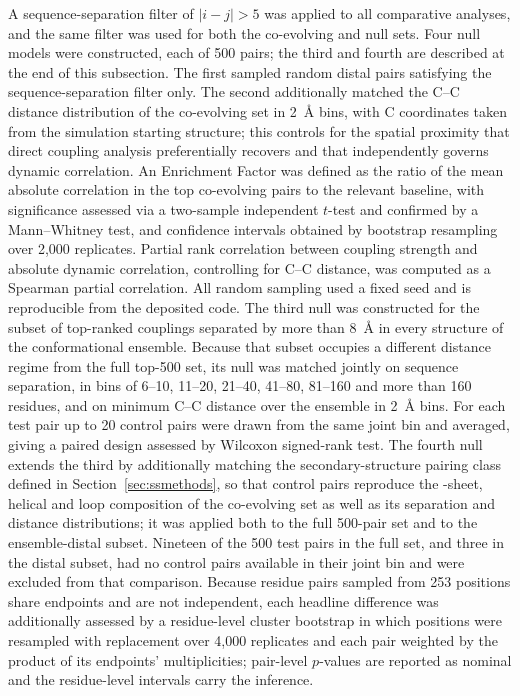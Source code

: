 \documentclass[utf8]{FrontiersinHarvard}
\begin{document}
A sequence-separation filter of $|i-j|>5$ was applied to all comparative analyses, and the same filter was used for both the co-evolving and null sets. Four null models were constructed, each of 500 pairs; the third and fourth are described at the end of this subsection. The first sampled random distal pairs satisfying the sequence-separation filter only. The second additionally matched the C\textalpha{}--C\textalpha{} distance distribution of the co-evolving set in 2~\AA{} bins, with C\textalpha{} coordinates taken from the simulation starting structure; this controls for the spatial proximity that direct coupling analysis preferentially recovers and that independently governs dynamic correlation. An Enrichment Factor was defined as the ratio of the mean absolute correlation in the top co-evolving pairs to the relevant baseline, with significance assessed via a two-sample independent $t$-test and confirmed by a Mann--Whitney test, and confidence intervals obtained by bootstrap resampling over 2,000 replicates. Partial rank correlation between coupling strength and absolute dynamic correlation, controlling for C\textalpha{}--C\textalpha{} distance, was computed as a Spearman partial correlation. All random sampling used a fixed seed and is reproducible from the deposited code. The third null was constructed for the subset of top-ranked couplings separated by more than 8~\AA{} in every structure of the conformational ensemble. Because that subset occupies a different distance regime from the full top-500 set, its null was matched jointly on sequence separation, in bins of 6--10, 11--20, 21--40, 41--80, 81--160 and more than 160 residues, and on minimum C\textalpha{}--C\textalpha{} distance over the ensemble in 2~\AA{} bins. For each test pair up to 20 control pairs were drawn from the same joint bin and averaged, giving a paired design assessed by Wilcoxon signed-rank test. The fourth null extends the third by additionally matching the secondary-structure pairing class defined in Section~\ref{sec:ssmethods}, so that control pairs reproduce the \textbeta{}-sheet, helical and loop composition of the co-evolving set as well as its separation and distance distributions; it was applied both to the full 500-pair set and to the ensemble-distal subset. Nineteen of the 500 test pairs in the full set, and three in the distal subset, had no control pairs available in their joint bin and were excluded from that comparison. Because residue pairs sampled from 253 positions share endpoints and are not independent, each headline difference was additionally assessed by a residue-level cluster bootstrap in which positions were resampled with replacement over 4,000 replicates and each pair weighted by the product of its endpoints' multiplicities; pair-level $p$-values are reported as nominal and the residue-level intervals carry the inference.
\end{document}
